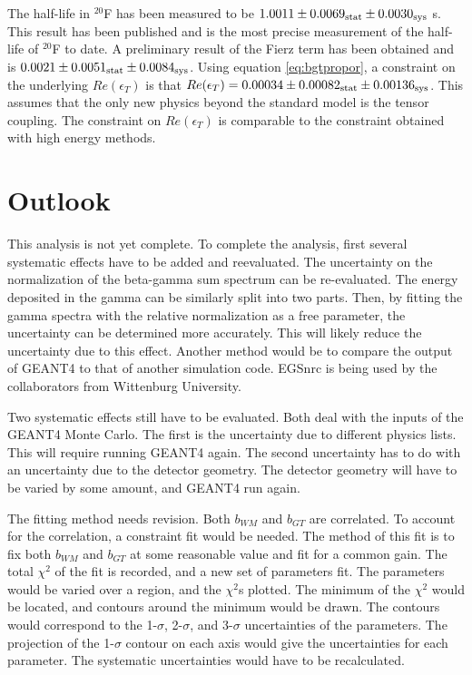 \documentclass[../MaxHughesThesis.tex]{subfiles}
\begin{document}
The half-life in $^{20}$F has been measured to be  $1.0011 \pm   0.0069_{\rm{stat}}  \pm 0.0030_{\rm{sys}}$ s.
This result has been published and is the most precise measurement of the half-life of $^{20}$F to date.
A preliminary result of the Fierz term has been obtained and is $0.0021 \pm 0.0051_{\rm{stat}} \pm 0.0084_{\rm{sys}}$.
Using equation \ref{eq:bgtpropor}, a constraint on the underlying $Re(\epsilon_{T})$ is that $Re(\epsilon_{T}) = 0.00034 \pm 0.00082_{\rm{stat}} \pm 0.00136_{\rm{sys}}$.
This assumes that the only new physics beyond the standard model is the tensor coupling. 
The constraint on $Re(\epsilon_{T})$ is comparable to the constraint obtained with high energy methods.

\section{Outlook}
This analysis is not yet complete.
To complete the analysis, first several systematic effects have to be added and reevaluated.
The uncertainty on the normalization of the beta-gamma sum spectrum can be re-evaluated.
The energy deposited in the gamma can be similarly split into two parts.
Then, by fitting the gamma spectra with the relative normalization as a free parameter, the uncertainty can be determined more accurately.
This will likely reduce the uncertainty due to this effect.
Another method would be to compare the output of GEANT4 to that of another simulation code.
EGSnrc is being used by the collaborators from Wittenburg University. 

Two systematic effects still have to be evaluated.
Both deal with the inputs of the GEANT4 Monte Carlo.
The first is the uncertainty due to different physics lists. 
This will require running GEANT4 again.
The second uncertainty has to do with an uncertainty due to the detector geometry.
The detector geometry will have to be varied by some amount, and GEANT4 run again.

The fitting method needs revision.
Both $b_{WM}$ and $b_{GT}$ are correlated.
To account for the correlation, a constraint fit would be needed.
The method of this fit is to fix both $b_{WM}$ and $b_{GT}$ at some reasonable value and fit for a common gain.
The total $\chi^{2}$ of the fit is recorded, and a new set of parameters fit. 
The parameters would be varied over a region, and the $\chi^{2}$s plotted.
The minimum of the $\chi^{2}$ would be located, and contours around the minimum would be drawn. 
The contours would correspond to the 1-$\sigma$, 2-$\sigma$, and 3-$\sigma$ uncertainties of the parameters. 
The projection of the 1-$\sigma$ contour on each axis would give the uncertainties for each parameter.
The systematic uncertainties would have to be recalculated.
\end{document}
